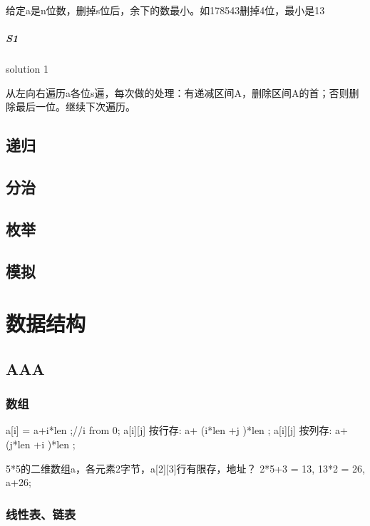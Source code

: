 \documentclass[UTF8]{../computerUniverse}
\begin{document}
\begin{question}
  给定a是n位数，删掉s位后，余下的数最小。如178543删掉4位，最小是13
 
   \paragraph{S1} solution 1

   从左向右遍历a各位s遍，每次做的处理：有递减区间A，删除区间A的首；否则删除最后一位。继续下次遍历。

 
 \end{question}

\section{递归}

\section{分治}

\section{枚举}

\section{模拟}





\chapter{数据结构}

\section{AAA}


\subsection{数组}
 a[i] = a+i*len ;//i from 0;
 a[i][j]  按行存: a+ (i*len +j )*len ;
 a[i][j]  按列存: a+ (j*len +i )*len ;

 5*5的二维数组a，各元素2字节，a[2][3]行有限存，地址？
 2*5+3 = 13, 13*2 = 26, a+26;



 

\subsection{线性表、链表}
\end{document}
